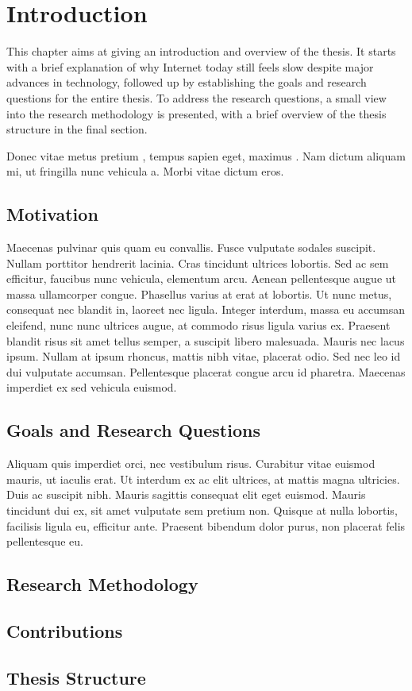 \chapter{Introduction}

This chapter aims at giving an introduction and overview of the thesis. It starts with a brief explanation of why Internet today still feels slow despite major advances in technology, followed up by establishing the goals and research questions for the entire thesis. To address the research questions, a small view into the research methodology is presented, with a brief overview of the thesis structure in the final section.

Donec vitae metus pretium \cite{abe}, tempus sapien eget, maximus . Nam dictum aliquam mi, ut fringilla nunc vehicula a. Morbi vitae dictum eros.

\section{Motivation}

Maecenas pulvinar quis quam eu convallis. Fusce vulputate sodales suscipit. Nullam porttitor hendrerit lacinia. Cras tincidunt ultrices lobortis. Sed ac sem efficitur, faucibus nunc vehicula, elementum arcu. Aenean pellentesque augue ut massa ullamcorper congue. Phasellus varius at erat at lobortis. Ut nunc metus, consequat nec blandit in, laoreet nec ligula. Integer interdum, massa eu accumsan eleifend, nunc nunc ultrices augue, at commodo risus ligula varius ex. Praesent blandit risus sit amet tellus semper, a suscipit libero malesuada. Mauris nec lacus ipsum. Nullam at ipsum rhoncus, mattis nibh vitae, placerat odio. Sed nec leo id dui vulputate accumsan. Pellentesque placerat congue arcu id pharetra. Maecenas imperdiet ex sed vehicula euismod.

\section{Goals and Research Questions}

Aliquam quis imperdiet orci, nec vestibulum risus. Curabitur vitae euismod mauris, ut iaculis erat. Ut interdum ex ac elit ultrices, at mattis magna ultricies. Duis ac suscipit nibh. Mauris sagittis consequat elit eget euismod. Mauris tincidunt dui ex, sit amet vulputate sem pretium non. Quisque at nulla lobortis, facilisis ligula eu, efficitur ante. Praesent bibendum dolor purus, non placerat felis pellentesque eu.

\section{Research Methodology}

\section{Contributions}

\section{Thesis Structure}